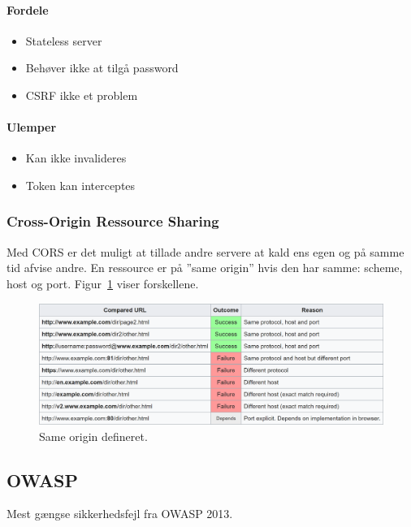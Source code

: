 \begin{multicols}{2}
	\paragraph{Fordele}

	\begin{itemize}
		\item Stateless server
		\item Behøver ikke at tilgå password
		\item CSRF ikke et problem
	\end{itemize}

	\paragraph{Ulemper}
	
	\begin{itemize}
		\item Kan ikke invalideres
		\item Token kan interceptes
	\end{itemize}
\end{multicols}

\subsubsection{Cross-Origin Ressource Sharing}
Med CORS er det muligt at tillade andre servere at kald ens egen og på samme tid afvise andre. En ressource er på ''same origin'' hvis den har samme: scheme, host og port. Figur~\ref{fig:cors-same-origin} viser forskellene.

\begin{figure}[h]
	\centering
	\includegraphics[width=\linewidth]{figs/spm6/cors-same-origin}
	\caption{Same origin defineret.}
	\label{fig:cors-same-origin}
\end{figure}


\subsection{OWASP}
Mest gængse sikkerhedsfejl fra OWASP 2013.

